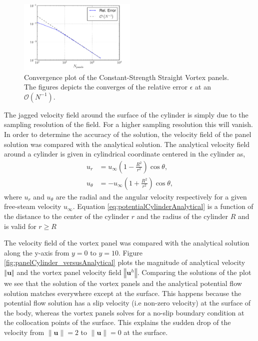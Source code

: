 	\begin{figure}[p]
	\centering
	\includegraphics[width=0.5\textwidth]{figures/lagrangian/panelCylinder_convergence_compressed.pdf}
	\caption{Convergence plot of the Constant-Strength Straight Vortex panels. The figures depicts the converges of the relative error $\epsilon$ at an $\mathcal{O}\left(N^{-1}\right)$.}
	\label{fig:panelCylinder_convergence}
	\end{figure}


The jagged velocity field around the surface of the cylinder is simply due to the sampling resolution of the field. For a higher sampling resolution this will vanish. In order to determine the accuracy of the solution, the velocity field of the panel solution was compared with the analytical solution. The analytical velocity field around a cylinder is given in cylindrical coordinate centered in the cylinder as,
	\begin{subequations}
	\begin{align}
	u_r &= u_{\infty}\left(1 - \frac{R^2}{r^2}\right)\cos\theta,\\
	u_{\theta} &= -u_{\infty}\left(1+\frac{R^2}{r^2}\right)\cos\theta,
	\end{align}
	\label{eq:potentialCylinderAnalytical}
	\end{subequations}	
where $u_r$ and $u_{\theta}$ are the radial and the angular velocity respectively for a given free-steam velocity $u_{\infty}$. Equation \ref{eq:potentialCylinderAnalytical} is a function of the distance to the center of the cylinder $r$ and the radius of the cylinder $R$ and is valid for $r\geqslant{R}$

The velocity field of the vortex panel was compared with the analytical solution along the y-axis from $y=0$ to $y=10$. Figure \ref{fig:panelCylinder_versusAnalytical} plots the magnitude of analytical velocity $\left\Vert\mathbf{u}\right\Vert$ and the vortex panel velocity field $\left\Vert\mathbf{u}^h\right\Vert$. Comparing the solutions of the plot we see that the solution of the vortex panels and the analytical potential flow solution matches everywhere except at the surface. This happens because the potential flow solution has a slip velocity (i.e non-zero velocity) at the surface of the body, whereas the vortex panels solves for a no-slip boundary condition at the collocation points of the surface. This explains the sudden drop of the velocity from $\lVert\mathbf{u}\rVert = 2$ to $\lVert\mathbf{u}\rVert = 0$ at the surface.	

